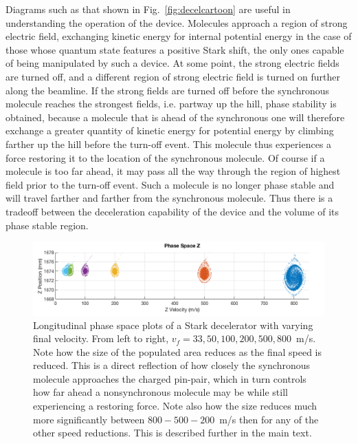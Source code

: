 Diagrams such as that shown in Fig.~\ref{fig:decelcartoon} are useful in understanding the operation of the device.
Molecules approach a region of strong electric field, exchanging kinetic energy for internal potential energy in the case of those whose quantum state features a positive Stark shift, the only ones capable of being manipulated by such a device.
At some point, the strong electric fields are turned off, and a different region of strong electric field is turned on further along the beamline.
If the strong fields are turned off before the synchronous molecule reaches the strongest fields, i.e. partway up the hill, phase stability is obtained, because a molecule that is ahead of the synchronous one will therefore exchange a greater quantity of kinetic energy for potential energy by climbing farther up the hill before the turn-off event.
This molecule thus experiences a force restoring it to the location of the synchronous molecule.
Of course if a molecule is too far ahead, it may pass all the way through the region of highest field prior to the turn-off event. Such a molecule is no longer phase stable and will travel farther and farther from the synchronous molecule.
Thus there is a tradeoff between the deceleration capability of the device and the volume of its phase stable region.

\begin{figure}[t!]
\centering
\includegraphics[width=\linewidth]{Slowing/phaseangles.png}%
\caption[Phase Space for Different Final Velocities]{\label{fig:variousphaseangles}
Longitudinal phase space plots of a Stark decelerator with varying final velocity. From left to right, $v_f=33, 50, 100, 200, 500, 800$~m/s. Note how the size of the populated area reduces as the final speed is reduced.  This is a direct reflection of how closely the synchronous molecule approaches the charged pin-pair, which in turn controls how far ahead a nonsynchronous molecule may be while still experiencing a restoring force. Note also how the size reduces much more significantly between $800-500-200$~m/s then for any of the other speed reductions. This is described further in the main text. 
}
\end{figure}

